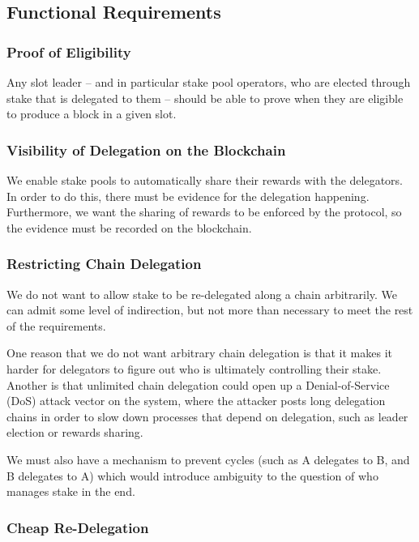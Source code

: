 \documentclass[11pt,a4paper]{article}
\begin{document}
\subsection{Functional Requirements}
\label{functional-requirements}

\subsubsection{Proof of Eligibility}
\label{proof-of-eligibility}

Any slot leader -- and in particular stake pool operators, who are
elected through stake that is delegated to them -- should be able to
prove when they are eligible to produce a block in a given slot.

\subsubsection{Visibility of Delegation on the Blockchain}
\label{visibility-of-delegation-on-the-blockchain}

We enable stake pools to automatically share their rewards with the
delegators. In order to do this, there must be evidence for the
delegation happening. Furthermore, we want the sharing of rewards to be
enforced by the protocol, so the evidence must be recorded on the
blockchain.

\subsubsection{Restricting Chain Delegation}
\label{restricting-chain-delegation}

We do not want to allow stake to be re-delegated along a chain
arbitrarily. We can admit some level of indirection, but not more than
necessary to meet the rest of the requirements.

One reason that we do not want arbitrary chain delegation is that it
makes it harder for delegators to figure out who is ultimately
controlling their stake. Another is that unlimited chain delegation
could open up a Denial-of-Service (DoS) attack vector on the system,
where the attacker posts long delegation chains in order to slow down
processes that depend on delegation, such as leader election or rewards
sharing.

We must also have a mechanism to prevent cycles (such as A delegates to
B, and B delegates to A) which would introduce ambiguity to the question
of who manages stake in the end.

\subsubsection{Cheap Re-Delegation}
\label{cheap-re-delegation}
\end{document}

